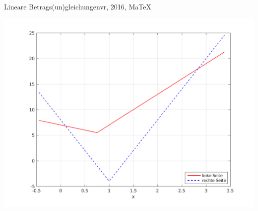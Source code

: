 \begin{MAufgabe}{Lineare Betrags(un)gleichungen}{vr, 2016, MaTeX}
 \begin{center}
 \includegraphics[width=0.8\linewidth]{Abb_zur_Ag_autogenerated_ineq_5.png} \end{center}
 
\else\relax\fi
 \end{MAufgabe}